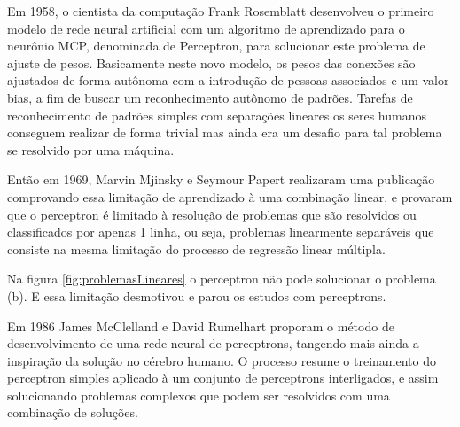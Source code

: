 \documentclass[	12pt, Times, openright, twoside, a4paper, english, brazil]{abntex2}
\begin{document}
            Em 1958, o cientista da computação Frank Rosemblatt desenvolveu o primeiro modelo de rede neural artificial com um algoritmo de aprendizado para o neurônio MCP, denominada de Perceptron, para solucionar este problema de ajuste de pesos.
            Basicamente neste novo modelo, os pesos das conexões são ajustados de forma autônoma com a introdução de pessoas associados e um valor bias, a fim de buscar um reconhecimento autônomo de padrões. Tarefas de reconhecimento de padrões simples com separações lineares os seres humanos conseguem realizar de forma trivial mas ainda era um desafio para tal problema se resolvido por uma máquina.
            
            Então em 1969, Marvin Mjinsky e Seymour Papert realizaram uma publicação comprovando essa limitação de aprendizado à uma combinação linear, e provaram que o perceptron é limitado à resolução de problemas que são resolvidos ou classificados por apenas 1 linha, ou seja, problemas linearmente separáveis que consiste na mesma limitação do processo de regressão linear múltipla.
            
            Na figura \ref{fig:problemasLineares} o perceptron não pode solucionar o problema (b). E essa limitação desmotivou e parou os estudos com perceptrons.
    		  \begin{figure}[H]
    		  	
    		  \end{figure}
	  	
	  	    Em 1986 James McClelland e David Rumelhart proporam o método de desenvolvimento de uma rede neural de perceptrons, tangendo mais ainda a inspiração da solução no cérebro humano. O processo resume o treinamento do perceptron simples aplicado à um conjunto de perceptrons interligados, e assim solucionando problemas complexos que podem ser resolvidos com uma combinação de soluções.
	  	  
\end{document}
